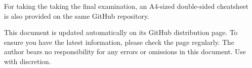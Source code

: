 \documentclass[10pt]{article}
\begin{document}
\setlength{\abovedisplayskip}{3pt}
\setlength{\belowdisplayskip}{3pt}
\setlength{\abovedisplayshortskip}{0pt}
\setlength{\belowdisplayshortskip}{0pt}

\maketitle


\tableofcontents
\listoffigures

\vfill

\begin{remark}
    For taking the taking the final examination, an A4-sized double-sided cheatsheet
    is also provided on the same GitHub repository.
\end{remark}

{
\footnotesize
This document is updated automatically on its GitHub distribution page.
To ensure you have the latest information, please check the page regularly.
The author bears no responsibility for any errors or omissions in this document.
Use with discretion.
}


\end{document}
